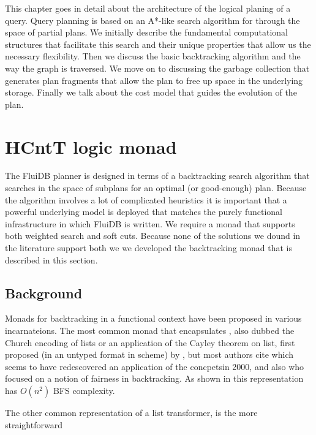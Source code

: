 This chapter goes in detail about the architecture of the logical
planing of a query. Query planning is based on an A*-like search
algorithm for through the space of partial plans. We initially
describe the fundamental computational structures that facilitate this
search and their unique properties that allow us the necessary
flexibility. Then we discuss the basic backtracking algorithm and the
way the graph is traversed. We move on to discussing the garbage
collection that generates plan fragments that allow the plan to free
up space in the underlying storage. Finally we talk about the cost
model that guides the evolution of the plan.
\section{HCntT logic monad}

The FluiDB planner is designed in terms of a backtracking search
algorithm that searches in the space of subplans for an optimal (or
good-enough) plan. Because the algorithm involves a lot of complicated
heuristics it is important that a powerful underlying model is
deployed that matches the purely functional infrastructure in which
FluiDB is written.  We require a monad that supports both weighted
search and soft cuts. Because none of the solutions we dound in the
literature support both we we developed the  backtracking monad
that is described in this section.

\subsection{Background}

Monads for backtracking in a functional context have been proposed in
various incarnateions.  The most common monad that encapsulates
, also
dubbed the Church encoding of lists or an application of the Cayley
theorem on list, first proposed (in an untyped format in scheme) by
\cite{haynesLogicContinuations1987}, but most authors cite
\cite{hinzeDerivingBacktrackingMonad2000a} which seems to have
redescovered an application of the concpetsin 2000, and also
\cite{kiselyovBacktrackingInterleavingTerminating} who focused on a
notion of fairness in backtracking. As shown in
\cite{kidneyAlgebrasWeightedSearch2021} this representation has
\(O(n^2)\) BFS complexity.

The other common representation of a list transformer, is the more
straightforward

